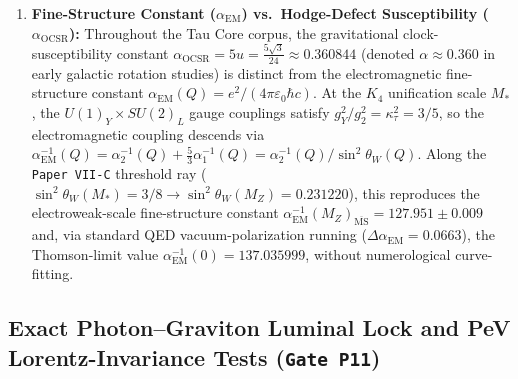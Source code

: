 \documentclass[11pt,a4paper]{article}
\begin{document}
\begin{enumerate}[label=(\roman*),leftmargin=1.8em,itemsep=2pt]
\begin{equation}
\boxed{
\begin{aligned}
\tilde{\hbar}_{\mathrm{geom}} &:= \frac{\hbar G}{c^3 \ell_*^2} = \frac{\ell_P^2}{\ell_*^2} = 2\,\mathcal{I}_{\hbar G} = \frac{1}{N!\,\pi}\\
 &= \frac{1}{24\pi} = \frac{u}{\sqrt{3}\,\pi} \approx 0.0132629119,\\
\tilde{\hbar}_{\mathrm{alg}} &:= r_{\mathrm{seed}} = \frac{1}{N} = 2\sqrt{3}\,u = \frac{1}{4}.
\end{aligned}
}
\label{eq:unit-free-planck}
\end{equation}
Equivalently, $\hbar = \ell_* M_* / c = S_0/(2\pi)$ is the elementary action quantum of one $K_4$ projector transition ($\Pi^2 = \Pi$), locking the plaquette entropy quantum $S_{\mathrm{plaq}}/k_B = 1/(4\tilde{\hbar}_{\mathrm{geom}}) = 6\pi$ and the extremal black-hole remnant mass $M_{\mathrm{rem}}/M_P = \frac{3\sqrt{3}}{4}\tilde{\hbar}_{\mathrm{geom}}^{-1/2} = \frac{9\sqrt{2\pi}}{2} = 11.2798$.
\item \textbf{Fine-Structure Constant ($\alpha_{\mathrm{EM}}$) vs.\ Hodge-Defect Susceptibility ($\alpha_{\mathrm{OCSR}}$):} Throughout the Tau Core corpus, the gravitational clock-susceptibility constant $\alpha_{\mathrm{OCSR}} = 5u = \frac{5\sqrt{3}}{24} \approx 0.360844$ (denoted $\alpha \approx 0.360$ in early galactic rotation studies) is distinct from the electromagnetic fine-structure constant $\alpha_{\mathrm{EM}}(Q) = e^2/(4\pi\varepsilon_0\hbar c)$. At the $K_4$ unification scale $M_*$, the $U(1)_Y \times SU(2)_L$ gauge couplings satisfy $g_Y^2/g_2^2 = \kappa_\tau^2 = 3/5$, so the electromagnetic coupling descends via $\alpha_{\mathrm{EM}}^{-1}(Q) = \alpha_2^{-1}(Q) + \frac{5}{3}\alpha_1^{-1}(Q) = \alpha_2^{-1}(Q)/\sin^2\theta_W(Q)$. Along the \texttt{Paper VII-C} threshold ray ($\sin^2\theta_W(M_*) = 3/8 \to \sin^2\theta_W(M_Z) = 0.231220$), this reproduces the electroweak-scale fine-structure constant $\alpha_{\mathrm{EM}}^{-1}(M_Z)_{\overline{\mathrm{MS}}} = 127.951 \pm 0.009$ and, via standard QED vacuum-polarization running ($\Delta\alpha_{\mathrm{EM}} = 0.0663$), the Thomson-limit value $\alpha_{\mathrm{EM}}^{-1}(0) = 137.035999$, without numerological curve-fitting.
\end{enumerate}

\subsection{Exact Photon--Graviton Luminal Lock and PeV Lorentz-Invariance Tests (\texttt{Gate P11})}
\end{document}
